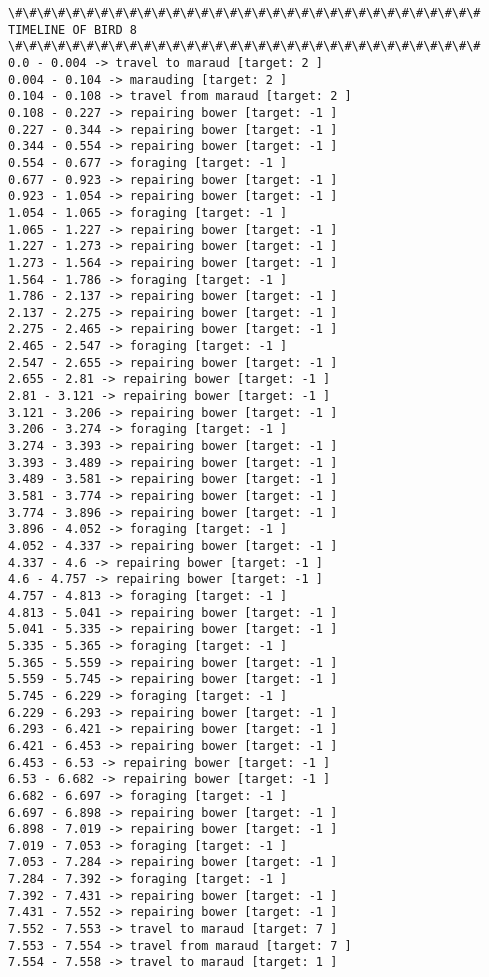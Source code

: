 \documentclass[11pt]{article}
\begin{document}
\begin{Verbatim}[commandchars=\\\{\}]
\#\#\#\#\#\#\#\#\#\#\#\#\#\#\#\#\#\#\#\#\#\#\#\#\#\#\#\#\#\#\#\#\#
TIMELINE OF BIRD 8
\#\#\#\#\#\#\#\#\#\#\#\#\#\#\#\#\#\#\#\#\#\#\#\#\#\#\#\#\#\#\#\#\#
0.0 - 0.004 -> travel to maraud [target: 2 ]
0.004 - 0.104 -> marauding [target: 2 ]
0.104 - 0.108 -> travel from maraud [target: 2 ]
0.108 - 0.227 -> repairing bower [target: -1 ]
0.227 - 0.344 -> repairing bower [target: -1 ]
0.344 - 0.554 -> repairing bower [target: -1 ]
0.554 - 0.677 -> foraging [target: -1 ]
0.677 - 0.923 -> repairing bower [target: -1 ]
0.923 - 1.054 -> repairing bower [target: -1 ]
1.054 - 1.065 -> foraging [target: -1 ]
1.065 - 1.227 -> repairing bower [target: -1 ]
1.227 - 1.273 -> repairing bower [target: -1 ]
1.273 - 1.564 -> repairing bower [target: -1 ]
1.564 - 1.786 -> foraging [target: -1 ]
1.786 - 2.137 -> repairing bower [target: -1 ]
2.137 - 2.275 -> repairing bower [target: -1 ]
2.275 - 2.465 -> repairing bower [target: -1 ]
2.465 - 2.547 -> foraging [target: -1 ]
2.547 - 2.655 -> repairing bower [target: -1 ]
2.655 - 2.81 -> repairing bower [target: -1 ]
2.81 - 3.121 -> repairing bower [target: -1 ]
3.121 - 3.206 -> repairing bower [target: -1 ]
3.206 - 3.274 -> foraging [target: -1 ]
3.274 - 3.393 -> repairing bower [target: -1 ]
3.393 - 3.489 -> repairing bower [target: -1 ]
3.489 - 3.581 -> repairing bower [target: -1 ]
3.581 - 3.774 -> repairing bower [target: -1 ]
3.774 - 3.896 -> repairing bower [target: -1 ]
3.896 - 4.052 -> foraging [target: -1 ]
4.052 - 4.337 -> repairing bower [target: -1 ]
4.337 - 4.6 -> repairing bower [target: -1 ]
4.6 - 4.757 -> repairing bower [target: -1 ]
4.757 - 4.813 -> foraging [target: -1 ]
4.813 - 5.041 -> repairing bower [target: -1 ]
5.041 - 5.335 -> repairing bower [target: -1 ]
5.335 - 5.365 -> foraging [target: -1 ]
5.365 - 5.559 -> repairing bower [target: -1 ]
5.559 - 5.745 -> repairing bower [target: -1 ]
5.745 - 6.229 -> foraging [target: -1 ]
6.229 - 6.293 -> repairing bower [target: -1 ]
6.293 - 6.421 -> repairing bower [target: -1 ]
6.421 - 6.453 -> repairing bower [target: -1 ]
6.453 - 6.53 -> repairing bower [target: -1 ]
6.53 - 6.682 -> repairing bower [target: -1 ]
6.682 - 6.697 -> foraging [target: -1 ]
6.697 - 6.898 -> repairing bower [target: -1 ]
6.898 - 7.019 -> repairing bower [target: -1 ]
7.019 - 7.053 -> foraging [target: -1 ]
7.053 - 7.284 -> repairing bower [target: -1 ]
7.284 - 7.392 -> foraging [target: -1 ]
7.392 - 7.431 -> repairing bower [target: -1 ]
7.431 - 7.552 -> repairing bower [target: -1 ]
7.552 - 7.553 -> travel to maraud [target: 7 ]
7.553 - 7.554 -> travel from maraud [target: 7 ]
7.554 - 7.558 -> travel to maraud [target: 1 ]

\end{Verbatim}
\end{document}
